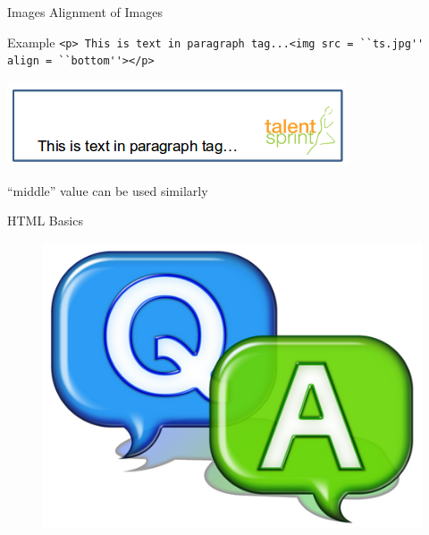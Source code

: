 \documentclass[14pt]{beamer}
\begin{document}
\begin{frame}{Images}
 Alignment of Images
 \begin{block}{Example}
  \lstinline!<p> This is text in paragraph tag...<img src = ``ts.jpg'' align = ``bottom''></p>!
 \end{block}
 \includegraphics[scale=.5]{text-image-bottom.png}
 
 ``middle'' value can be used similarly
\end{frame}










\begin{frame}{HTML Basics}
 \begin{figure}[H]
 \begin{center}
   \includegraphics[scale=.3]{qa.png}   
 \end{center}
  \end{figure}
\end{frame}
\end{document}
